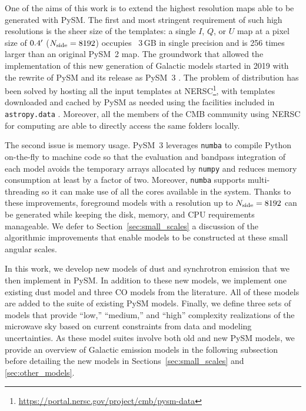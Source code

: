 \documentclass[twocolumn]{aastex631}
\begin{document}
One of the aims of this work is to extend the highest resolution maps able to be generated with PySM. The first and most stringent requirement of such high resolutions is the sheer size of the templates: a single $I$, $Q$, or $U$ map at a pixel size of $0.4\mbox{$^\prime$}$ ($N_{\rm side}=8192$) occupies ~3\,GB in single precision and is 256 times larger than an original PySM~2 map. The groundwork that allowed the implementation of this new generation of Galactic models started in 2019 with the rewrite of PySM and its release as PySM~3 \citep[see][for details]{Zonca:2021}. The problem of distribution has been solved by hosting all the input templates at NERSC\footnote{\url{https://portal.nersc.gov/project/cmb/pysm-data}}, with templates downloaded and cached by PySM as needed using the facilities included in \texttt{astropy.data} \citep{AstropyCollaboration:2013, AstropyCollaboration:2018}. Moreover, all the members of the CMB community using NERSC for computing are able to directly access the same folders locally.

The second issue is memory usage. PySM~3 leverages \texttt{numba} \citep{Lam:2015} to compile Python on-the-fly to machine code so that the evaluation and bandpass integration of each model avoids the temporary arrays allocated by \texttt{numpy} and reduces memory consumption at least by a factor of two. Moreover, \texttt{numba} supports multi-threading so it can make use of all the cores available in the system. Thanks to these improvements, foreground models with a resolution up to $N_{\rm side}=8192$ can be generated while keeping the disk, memory, and CPU requirements manageable. We defer to Section~\ref{sec:small_scales} a discussion of the algorithmic improvements that enable models to be constructed at these small angular scales.

In this work, we develop new models of dust and synchrotron emission that we then implement in PySM. In addition to these new models, we implement one existing dust model and three CO models from the literature. All of these models are added to the suite of existing PySM models. Finally, we define three sets of models that provide ``low,'' ``medium,'' and ``high'' complexity realizations of the microwave sky based on current constraints from data and modeling uncertainties. As these model suites involve both old and new PySM models, we provide an overview of Galactic emission models in the following subsection before detailing the new models in Sections~\ref{sec:small_scales} and \ref{sec:other_models}.
\end{document}
